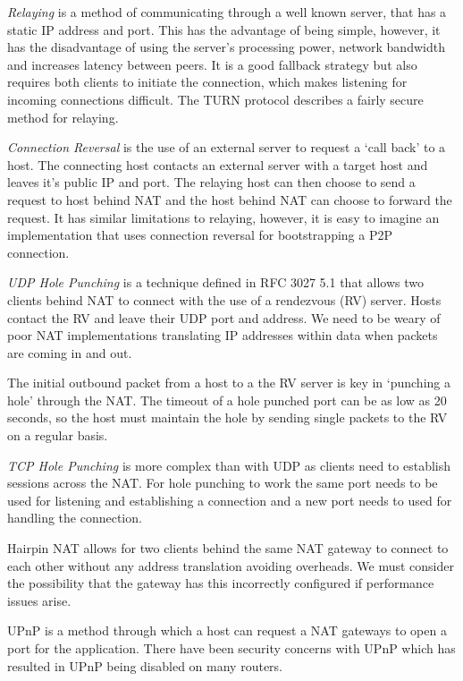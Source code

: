 \documentclass[11pt, a4paper, twoside]{report}
\begin{document}
\emph{Relaying} is a method of communicating through a well known server, that has a static IP address and port. This has the advantage of being simple, however, it has the disadvantage of using the server's processing power, network bandwidth and increases latency between peers. It is a good fallback strategy but also requires both clients to initiate the connection, which makes listening for incoming connections difficult. The TURN protocol \citep{rosenberg2005traversal} describes a fairly secure method for relaying.

\emph{Connection Reversal} is the use of an external server to request a `call back' to a host. The connecting host contacts an external server with a target host and leaves it's public IP and port. The relaying host can then choose to send a request to host behind NAT and the host behind NAT can choose to forward the request. It has similar limitations to relaying, however, it is easy to imagine an implementation that uses connection reversal for bootstrapping a P2P connection.

\emph{UDP Hole Punching} is a technique defined in RFC 3027 5.1 \citep{holdrege2001rfc} that allows two clients behind NAT to connect with the use of a rendezvous (RV) server. Hosts contact the RV and leave their UDP port and address. We need to be weary of poor NAT implementations translating IP addresses within data when packets are coming in and out. \citep{ford2005peer}

The initial outbound packet from a host to a the RV server is key in `punching a hole' through the NAT. The timeout of a hole punched port can be as low as 20 seconds, so the host must maintain the hole by sending single packets to the RV on a regular basis.

\emph{TCP Hole Punching} is more complex than with UDP as clients need to establish sessions across the NAT. For hole punching to work the same port needs to be used for listening and establishing a connection and a new port needs to used for handling the connection.

Hairpin NAT allows for two clients behind the same NAT gateway to connect to each other without any address translation avoiding overheads. We must consider the possibility that the gateway has this incorrectly configured if performance issues arise.

UPnP \citep{boucadair2013universal} is a method through which a host can request a NAT gateways to open a port for the application. There have been security concerns with UPnP which has resulted in UPnP being disabled on many routers.
\end{document}
